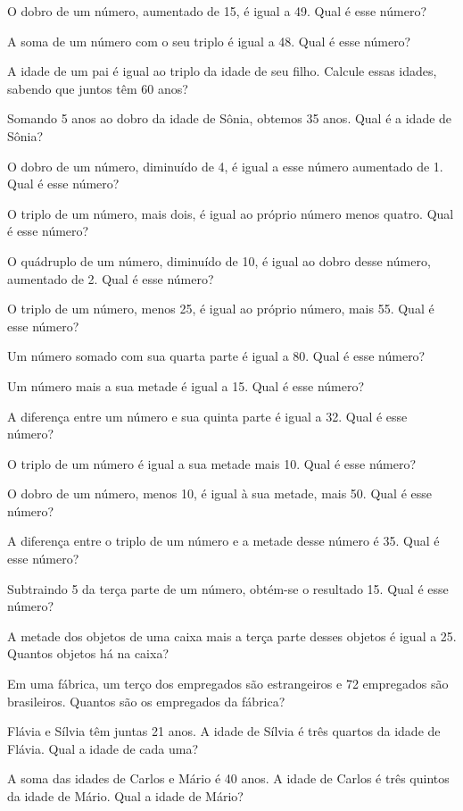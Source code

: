 				\item O dobro de um número, aumentado de 15, é igual a 49. Qual é esse número?
				\item A soma de um número com o seu triplo é igual a 48. Qual é esse número?
				\item A idade de um pai é igual ao triplo da idade de seu filho. Calcule essas idades, sabendo que juntos têm 60 anos?
				\item Somando 5 anos ao dobro da idade de Sônia, obtemos 35 anos. Qual é a idade de Sônia?
				\item O dobro de um número, diminuído de 4, é igual a esse número aumentado de 1. Qual é esse número?
				\item O triplo de um número, mais dois, é igual ao próprio número menos quatro. Qual é esse número?
				\item O quádruplo de um número, diminuído de 10, é igual ao dobro desse número, aumentado de 2. Qual é esse número?
				\item O triplo de um número, menos 25, é igual ao próprio número, mais 55. Qual é esse número?				
				\item Um número somado com sua quarta parte é igual a 80. Qual é esse número?
				\item Um número mais a sua metade é igual a 15. Qual é esse número?
				\item A diferença entre um número e sua quinta parte é igual a 32. Qual é esse número?
				\item O triplo de um número é igual a sua metade mais 10. Qual é esse número?
				\item O dobro de um número, menos 10, é igual à sua metade, mais 50. Qual é esse número?
				\item A diferença entre o triplo de um número e a metade desse número é 35. Qual é esse número?
				\item Subtraindo 5 da terça parte de um número, obtém-se o resultado 15. Qual é esse número?
				\item A metade dos objetos de uma caixa mais a terça parte desses objetos é igual a 25. Quantos objetos há na caixa?
				\item Em uma fábrica, um terço dos empregados são estrangeiros e 72 empregados são brasileiros. Quantos são os empregados da fábrica?
				\item Flávia e Sílvia têm juntas 21 anos. A idade de Sílvia é três quartos da idade de Flávia. Qual a idade de cada uma?
				\item A soma das idades de Carlos e Mário é 40 anos. A idade de Carlos é três quintos da idade de Mário. Qual a idade de Mário?

